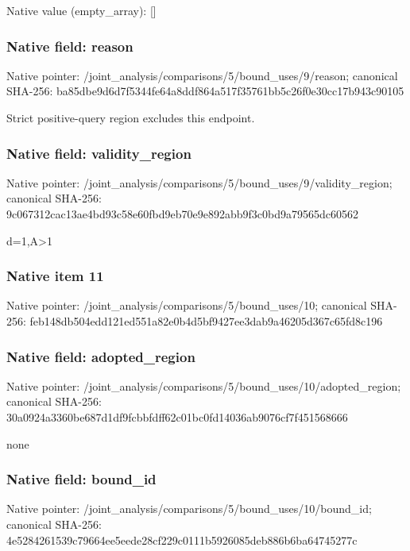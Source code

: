 \documentclass[10pt,a4paper]{article}
\begin{document}
Native value (empty\_\allowbreak{}array): []

\subsubsection{Native field: reason}
Native pointer: /joint\_\allowbreak{}analysis/comparisons/5/bound\_\allowbreak{}uses/9/reason; canonical SHA-256: ba85dbe9d6d7f5344fe64a8ddf864a517f35761bb5c26f0e30cc17b943c90105

\begingroup\raggedright\sloppy Strict positive-query region excludes this endpoint.\par\endgroup

\subsubsection{Native field: validity\_\allowbreak{}region}
Native pointer: /joint\_\allowbreak{}analysis/comparisons/5/bound\_\allowbreak{}uses/9/validity\_\allowbreak{}region; canonical SHA-256: 9c067312cac13ae4bd93c58e60fbd9eb70e9e892abb9f3c0bd9a79565dc60562

\begingroup\raggedright\sloppy d=\allowbreak{}1,\allowbreak{}A>1\par\endgroup

\subsubsection{Native item 11}
Native pointer: /joint\_\allowbreak{}analysis/comparisons/5/bound\_\allowbreak{}uses/10; canonical SHA-256: feb148db504edd121ed551a82e0b4d5bf9427ee3dab9a46205d367c65fd8c196

\subsubsection{Native field: adopted\_\allowbreak{}region}
Native pointer: /joint\_\allowbreak{}analysis/comparisons/5/bound\_\allowbreak{}uses/10/adopted\_\allowbreak{}region; canonical SHA-256: 30a0924a3360be687d1df9fcbbfdff62c01bc0fd14036ab9076cf7f451568666

\begingroup\raggedright\sloppy none\par\endgroup

\subsubsection{Native field: bound\_\allowbreak{}id}
Native pointer: /joint\_\allowbreak{}analysis/comparisons/5/bound\_\allowbreak{}uses/10/bound\_\allowbreak{}id; canonical SHA-256: 4e5284261539c79664ee5eede28cf229c0111b5926085deb886b6ba64745277c
\end{document}
